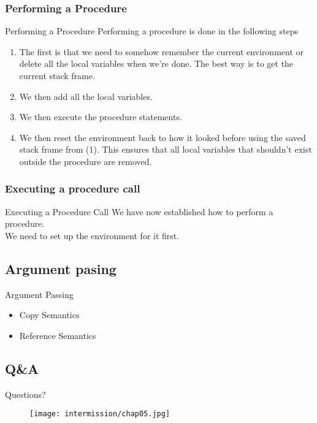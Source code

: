 \subsubsection*{Performing a Procedure}
\begin{frame}{Performing a Procedure}
    Performing a procedure is done in the following steps
    \begin{enumerate}[<+->]
        \item The first is that we need to somehow remember the current environment or delete all the local variables when we're done. The best way is to get the current stack frame.
        \item We then add all the local variables.
        \item We then execute the procedure statements.
        \item We then reset the environment back to how it looked before using the saved stack frame from (1). This ensures that all local variables
        that shouldn't exist outside the procedure are removed. 
    \end{enumerate}
\end{frame}

\subsubsection*{Executing a procedure call}
\begin{frame}{Executing a Procedure Call}
    We have now established how to perform a procedure.\\
    We need to set up the environment for it first.
\end{frame}
\subsection{Argument pasing}
\begin{frame}{Argument Passing}
    \begin{itemize}[<+->]
        \item Copy Semantics
        \item Reference Semantics
    \end{itemize}
\end{frame}

\subsection*{Q\&A}
\begin{frame}{Questions?}
    \begin{figure}
        \centering
        \texttt{[image: intermission/chap05.jpg]}
    \end{figure}
\end{frame}